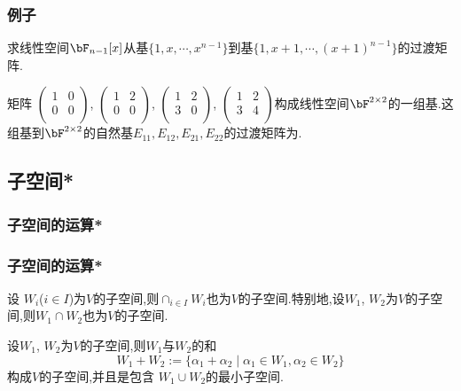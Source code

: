 \begin{frame}\frametitle{例子}
\begin{example}
求线性空间$\bF_{n-1}[x]$从基$\{1,x,\cdots,x^{n-1}\}$到基$\{1,x+1,\cdots,(x+1)^{n-1}\}$的过渡矩阵.
\end{example}
\pp
\begin{example}矩阵
$\begin{pmatrix}1&0\\0&0\\\end{pmatrix}$,
$\begin{pmatrix}1&2\\0&0\\\end{pmatrix}$,
$\begin{pmatrix}1&2\\3&0\\\end{pmatrix}$,
$\begin{pmatrix}1&2\\3&4\\\end{pmatrix}$构成线性空间$\bF^{2\times2}$的一组基.\pp 这组基到$\bF^{2\times2}$的自然基$E_{11},E_{12},E_{21},E_{22}$的过渡矩阵为\underline{\qquad\qquad\qquad}.
\end{example}
\end{frame}



\subsection{子空间*}









\subsubsection{子空间的运算*}
\begin{frame}\frametitle{子空间的运算*}
\pp
{}
\pp
\begin{theorem}
设 $W_i$($i\in I$)为$V$的子空间,则$\cap_{i\in I}W_i$也为$V$的子空间.\pp 特别地,设$W_1$, $W_2$为$V$的子空间,则$W_1\cap W_2$也为$V$的子空间.
\end{theorem}

\pp
{}
\pp
{}
\pp
\begin{theorem}
设$W_1$, $W_2$为$V$的子空间,则$W_1$与$W_2$的和
\[W_1+W_2:=\{\alpha_1+\alpha_2 \mid \alpha_1\in W_1,\alpha_2\in W_2\}\]
构成$V$的子空间,并且是包含 $W_1\cup W_2$的最小子空间.
\end{theorem}

\end{frame}






